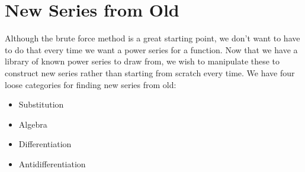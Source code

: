 \section{New Series from Old}

Although the brute force method is a great starting point, we don't want to have to do that every time we want a power series for a function.  Now that we have a library of known power series to draw from, we wish to manipulate these to construct new series rather than starting from scratch every time.  We have four loose categories for finding new series from old:
\begin{itemize}
\item Substitution
\item Algebra 
\item Differentiation
\item Antidifferentiation
\end{itemize}

